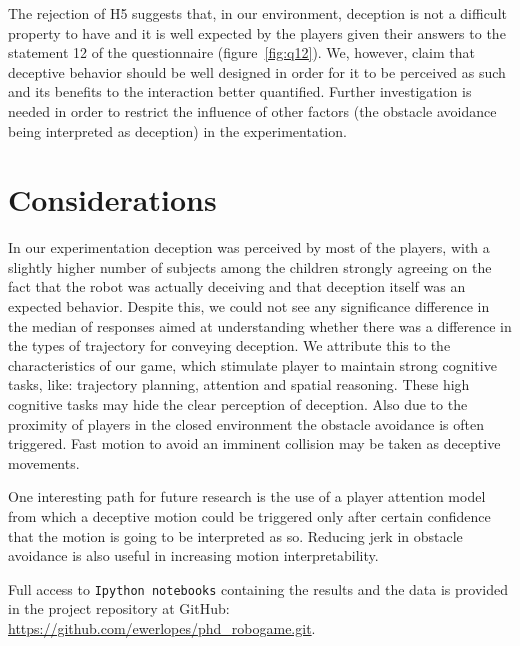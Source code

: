 The rejection of H5 suggests that, in our environment, deception is not a difficult property to have and it is well expected by the players given their answers to the statement 12 of the questionnaire (figure~\ref{fig:q12}). We, however, claim that deceptive behavior should be well designed in order for it to be perceived as such and its benefits to the interaction better quantified. Further investigation is needed in order to restrict the influence of other factors (\eg the obstacle avoidance being interpreted as deception) in the experimentation.

\section{Considerations}

In our experimentation deception was perceived by most of the players, with a slightly higher number of subjects among the children strongly agreeing on the fact that the robot was actually deceiving and that deception itself was an expected behavior. Despite this, we could not see any significance difference in the median of responses aimed at understanding whether there was a difference in the types of trajectory for conveying deception. We attribute this to the characteristics of our game, which stimulate player to maintain strong cognitive tasks, like: trajectory planning, attention and spatial reasoning. These high cognitive tasks may hide the clear perception of deception. Also due to the proximity of players in the closed environment the obstacle avoidance is often triggered. Fast motion to avoid an imminent collision may be taken as deceptive movements.

One interesting path for future research is the use of a player attention model from which a deceptive motion could be triggered only after certain confidence that the motion is going to be interpreted as so. Reducing jerk in obstacle avoidance is also useful in increasing motion interpretability.

Full access to \verb|Ipython notebooks| containing the results and the data is provided in the project repository at GitHub: \url{https://github.com/ewerlopes/phd_robogame.git}.